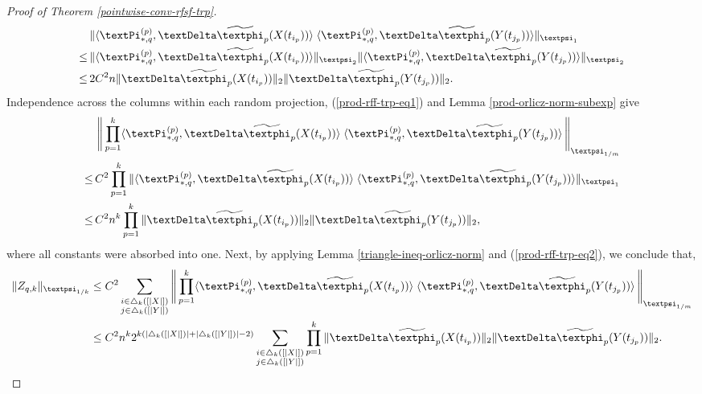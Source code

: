 \documentclass[openany]{book}
\begin{document}
\begin{proof}[Proof of Theorem \ref{pointwise-conv-rfsf-trp}]
        \begin{equation}\label{prod-rff-trp-eq1}
        \begin{split}
            &\,\|\langle{\gPi_{\ast ,q}^{(p)} },\gDelta\widetilde{\gphi}_p(X(t_{i_p}))\rangle \;\langle{\gPi_{\ast ,q}^{(p)} },\gDelta\widetilde{\gphi}_p(Y(t_{j_p}))\rangle\|_{\gpsi_1}\\\leq&\, \| \langle{\gPi_{\ast ,q}^{(p)} },\gDelta\widetilde{\gphi}_p(X(t_{i_p}))\rangle\|_{\gpsi_2}\|\langle{\gPi_{\ast ,q}^{(p)} },\gDelta\widetilde{\gphi}_p(Y(t_{j_p}))\rangle\|_{\gpsi_2}\\\leq&\, 2C^2n\|\gDelta\widetilde{\gphi}_p(X(t_{i_p}))\|_2\|\gDelta\widetilde{\gphi}_p(Y(t_{j_p}))\|_{2}.
        \end{split}
        \end{equation}
        Independence across the columns within each random projection, (\ref{prod-rff-trp-eq1}) and Lemma \ref{prod-orlicz-norm-subexp} give
        \begin{equation}\label{prod-rff-trp-eq2}
        \begin{split}
            &\,\left\|\,\prod_{p=1}^k \langle{\gPi_{\ast ,q}^{(p)} },\gDelta\widetilde{\gphi}_p(X(t_{i_p}))\rangle \;\langle{\gPi_{\ast ,q}^{(p)} },\gDelta\widetilde{\gphi}_p(Y(t_{j_p}))\rangle\,\right\|_{\gpsi_{1/m}} \\\leq&\, C^2\prod_{p=1}^k\| \langle{\gPi_{\ast ,q}^{(p)} },\gDelta\widetilde{\gphi}_p(X(t_{i_p}))\rangle \;\langle{\gPi_{\ast ,q}^{(p)} },\gDelta\widetilde{\gphi}_p(Y(t_{j_p}))\rangle\|_{\gpsi_1}
            \\\leq&\,C^2n^k\prod_{p=1}^k\|\gDelta\widetilde{\gphi}_p(X(t_{i_p}))\|_2\|\gDelta\widetilde{\gphi}_p(Y(t_{j_p}))\|_{2},
        \end{split}
        \end{equation}
        where all constants were absorbed into one.
        Next, by applying Lemma \ref{triangle-ineq-orlicz-norm} and (\ref{prod-rff-trp-eq2}), we conclude that,
        \begin{equation}\label{prod-rff-trp-eq3}
        \begin{split}
            \|Z_{q,k}\|_{\gpsi_{1/k}}&\leq C^2\sum_{\substack{i\in \triangle_k([\vert X\vert ])\\ j\in \triangle_k([\vert Y\vert ])}} \left\|\,\prod_{p=1}^k \langle{\gPi_{\ast ,q}^{(p)} },\gDelta\widetilde{\gphi}_p(X(t_{i_p}))\rangle \;\langle{\gPi_{\ast ,q}^{(p)} },\gDelta\widetilde{\gphi}_p(Y(t_{j_p}))\rangle\,\right\|_{\gpsi_{1/m}}\\ &\leq C^2n^k2^{k(\vert\triangle_k([\vert X\vert ]) \vert +\vert \triangle_k([\vert Y\vert ])\vert -2)}\sum_{\substack{i\in \triangle_k([\vert X\vert ])\\ j\in \triangle_k([\vert Y\vert ])}}\prod_{p=1}^k\|\gDelta\widetilde{\gphi}_p(X(t_{i_p}))\|_2\|\gDelta\widetilde{\gphi}_p(Y(t_{j_p}))\|_{2}.

\end{split}
\end{equation}
\end{proof}
\end{document}
